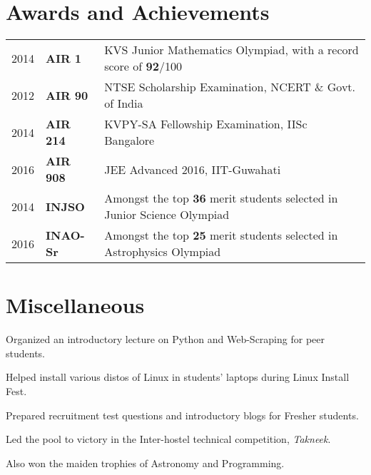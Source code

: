 \documentclass[]{deedy-resume-openfont}
\begin{document}
\begin{minipage}[t]{0.70\textwidth}
\section{Awards and Achievements} 
\begin{tabular}{rll}
  2014	   & \textbf{AIR 1}  & KVS Junior Mathematics Olympiad, with a record score of \textbf{92}/100 \\
  2012	   & \textbf{AIR 90} & NTSE Scholarship Examination, NCERT \& Govt. of India \\
  2014	   & \textbf{AIR 214}& KVPY-SA Fellowship Examination, IISc Bangalore \\
  2016     & \textbf{AIR 908}& JEE Advanced 2016, IIT-Guwahati \\
  2014	    & \textbf{INJSO}   & Amongst the top \textbf{36} merit students selected in Junior Science Olympiad   \\
  2016      & \textbf{INAO-Sr} & Amongst the top \textbf{25} merit students selected in Astrophysics Olympiad  \\
\end{tabular}


\section{Miscellaneous}

\vspace{0 mm}
\begin{tightemize}
    \item Organized an introductory lecture on Python and Web-Scraping for peer students.
    \item Helped install various distos of Linux in students' laptops during Linux Install Fest.
    \item Prepared recruitment test questions and introductory blogs for Fresher students. 
\end{tightemize}

\begin{tightemize}
    \item Led the pool to victory in the Inter-hostel technical competition, \textit{Takneek}.
    \item Also won the maiden trophies of Astronomy and Programming.
\end{tightemize}


\end{minipage}
\end{document}
